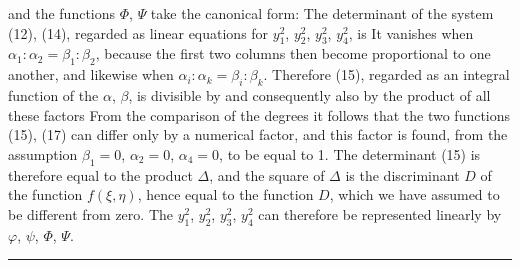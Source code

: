 and the functions $\Phi$, $\Psi$ take the canonical form:
The determinant of the system (12), (14), regarded as linear equations
for $y_1^2$, $y_2^2$, $y_3^2$, $y_4^2$, is
It vanishes when $\alpha_1:\alpha_2 = \beta_1:\beta_2$, because the
first two columns then become proportional to one another, and likewise
when $\alpha_i:\alpha_k = \beta_i:\beta_k$. Therefore (15), regarded as
an integral function of the $\alpha$, $\beta$, is divisible by
and consequently also by the product of all these factors
From the comparison of the degrees it follows that the two functions
(15), (17) can differ only by a numerical factor, and this factor is
found, from the assumption $\beta_1 = 0$, $\alpha_2 = 0$,
$\alpha_4 = 0$, to be equal to 1. The determinant (15) is therefore
equal to the product $\Delta$, and the square of $\Delta$ is the
discriminant $D$ of the function $f(\xi,\eta)$, hence equal to the
function $D$, which we have assumed to be different from zero. The
$y_1^2$, $y_2^2$, $y_3^2$, $y_4^2$ can therefore be represented
linearly by $\varphi$, $\psi$, $\Phi$, $\Psi$.

\begin{center}
\rule{2cm}{0.4pt}
\end{center}

